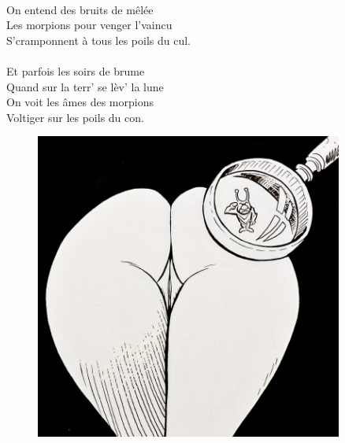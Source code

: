 \\On entend des bruits de mêlée
\\Les morpions pour venger l'vaincu
\\S'cramponnent à tous les poils du cul.
\\\\Et parfois les soirs de brume
\\Quand sur la terr' se lèv' la lune
\\On voit les âmes des morpions
\\Voltiger sur les poils du con.
\\
\begin{figure}[h!]
\centering
   \includegraphics[width=0.9\textwidth]{images/de_profondis.jpg}
 \end{figure}

\breakpage